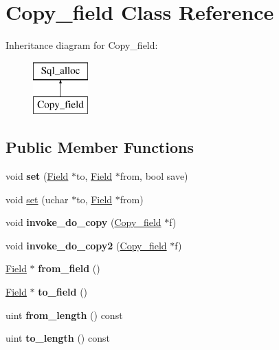 \hypertarget{classCopy__field}{}\section{Copy\+\_\+field Class Reference}
\label{classCopy__field}
Inheritance diagram for Copy\+\_\+field\+:\begin{figure}[H]
\begin{center}
\leavevmode
\includegraphics[height=2.000000cm]{classCopy__field}
\end{center}
\end{figure}
\subsection*{Public Member Functions}
\begin{DoxyCompactItemize}
\item 
\mbox{\label{classCopy__field_ae7cd30b9a0dfe29dd6704bf3ebe284ee}} 
void {\bfseries set} (\mbox{\hyperlink{classField}{Field}} $\ast$to, \mbox{\hyperlink{classField}{Field}} $\ast$from, bool save)
\item 
void \mbox{\hyperlink{classCopy__field_afd94df7df118797ab8f39c9eeb2c1093}{set}} (uchar $\ast$to, \mbox{\hyperlink{classField}{Field}} $\ast$from)
\item 
\mbox{\label{classCopy__field_ab9984d5b2d3b7e41ba5552d6db1dda5d}} 
void {\bfseries invoke\+\_\+do\+\_\+copy} (\mbox{\hyperlink{classCopy__field}{Copy\+\_\+field}} $\ast$f)
\item 
\mbox{\label{classCopy__field_abe28cf24bfaa13c3e4e6e1c42a654d8c}} 
void {\bfseries invoke\+\_\+do\+\_\+copy2} (\mbox{\hyperlink{classCopy__field}{Copy\+\_\+field}} $\ast$f)
\item 
\mbox{\label{classCopy__field_a2699ade44fb24a3cc465cbbe93dbce27}} 
\mbox{\hyperlink{classField}{Field}} $\ast$ {\bfseries from\+\_\+field} ()
\item 
\mbox{\label{classCopy__field_a0010c74710c4f758b751f23911efbcff}} 
\mbox{\hyperlink{classField}{Field}} $\ast$ {\bfseries to\+\_\+field} ()
\item 
\mbox{\label{classCopy__field_a6a8715821628c6937a824c678c62fc69}} 
uint {\bfseries from\+\_\+length} () const
\item 
\mbox{\label{classCopy__field_a87c9b15a987f4b9121ace95863c16e91}} 
uint {\bfseries to\+\_\+length} () const
\end{DoxyCompactItemize}
